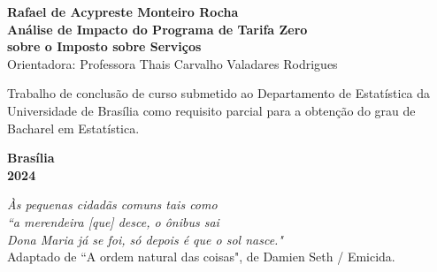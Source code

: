 \documentclass[12pt, a4paper, twoside]{article}
\numberwithin{equation}{subsection} %
\newcommand{\titulo}{Análise de Impacto do Programa de Tarifa
Zero \\ sobre o Imposto sobre Serviços}
\newcommand{\autor}{Rafael de Acypreste Monteiro Rocha}
\newcommand{\orientador}{ Professora Thais Carvalho Valadares
Rodrigues }
\newcommand{\coorientador}{ Prof(a).  }
\begin{document}

\thispagestyle{empty}

\begin{center}
\textbf{\autor} \\
\vspace{5cm}
\textbf{\titulo} \\
\vspace{3cm}
\small
Orientadora: \orientador \\
\end{center}


\vspace*{3cm}

\begin{flushright}
\begin{minipage}{7.5cm}
 \parbox[t]{7.5cm}{Trabalho de conclusão de curso submetido ao
Departamento de Estatística da Universidade de Brasília como requisito
parcial para a obtenção do grau de Bacharel em Estatística.}
\end{minipage}
\end{flushright}

\vspace{5cm}

\begin{center}
{\bf{Brasília} \\ }
\bf{2024}
\end{center}




\newpage %
\thispagestyle{empty} %


\begin{flushright} %
\textit{Às pequenas cidadãs comuns tais como \\
        ``a merendeira [que] desce, o ônibus sai \\
        Dona Maria já se foi, só depois é que o sol nasce."}\\
\vspace{1cm}        
Adaptado de ``A ordem natural das coisas", de Damien Seth / Emicida.
\end{flushright}


\setcounter{page}{3} 
\end{document}
